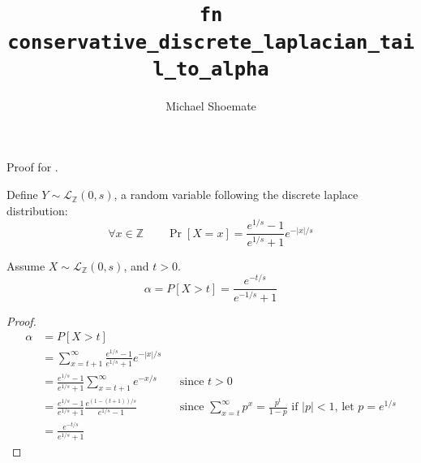 \documentclass{article}
\title{\texttt{fn conservative\_discrete\_laplacian\_tail\_to\_alpha}}
\author{Michael Shoemate}
\begin{document}
\maketitle

\contrib

Proof for .

\begin{definition}
    Define $Y \sim \mathcal{L}_\mathbb{Z}(0, s)$, a random variable following the discrete laplace distribution:
    \begin{equation}
        \forall x \in \mathbb{Z} \qquad \Pr[X = x] = \frac{e^{1/s} - 1}{e^{1/s} + 1} e^{-|x|/s}
    \end{equation}
\end{definition}

\begin{theorem}
    Assume $X \sim \mathcal{L}_\mathbb{Z}(0, s)$, and $t > 0$.
    \begin{equation}
        \alpha = P[X > t] = \frac{e^{-t/s}}{e^{-1/s} + 1}
    \end{equation}
\end{theorem}

\begin{proof}
    \begin{align*}
        \alpha &= P[X > t] \\
        &= \sum_{x=t + 1}^{\infty} \frac{e^{1/s} - 1}{e^{1/s} + 1} e^{-|x|/s} \\
        &= \frac{e^{1/s} - 1}{e^{1/s} + 1} \sum_{x=t + 1}^{\infty} e^{-x/s} 
            && \text{since } t > 0 \\
        &= \frac{e^{1/s} - 1}{e^{1/s} + 1} \frac{e^{(1-(t + 1))/s}}{e^{1/s} - 1} 
            && \text{since } \sum_{x=t}^\infty p^x = \frac{p^t}{1 - p} \text{ if } |p| < 1 \text{, let } p = e^{1/s}\\
        &= \frac{e^{-t/s}}{e^{1/s} + 1}
    \end{align*}

\end{proof}
\end{document}
